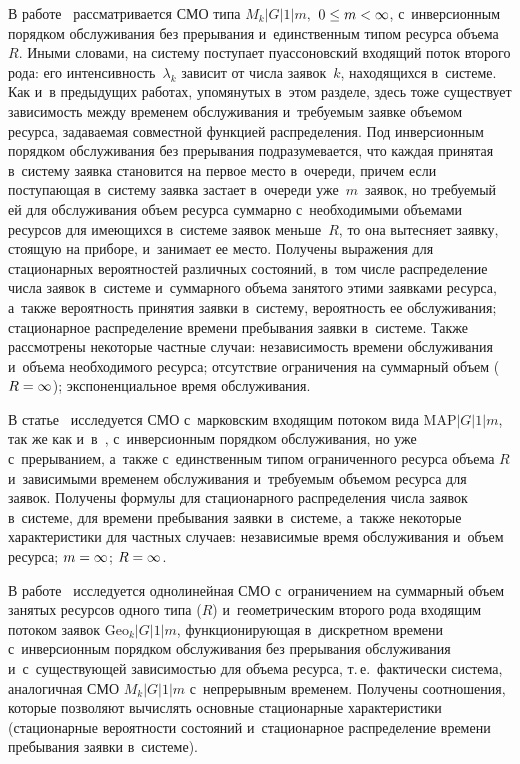 \begin{multicols}{2}
В работе~\cite{Pechinkin_30_1998} рассматривается СМО типа $M_k|G|1|m,$ $0\hm\leq m 
\hm<\infty$, с~инверсионным порядком обслуживания без прерывания и~единственным 
типом ресурса объема~$R$. Иными словами, на сис\-те\-му поступает пуассоновский 
входящий поток второго рода: его интенсивность~$\lambda_k$ зависит от числа 
заявок~$k$, находящихся в~сис\-те\-ме. Как и~в предыду\-щих работах, упомянутых в~этом 
разделе, здесь тоже существует зависимость между временем обслуживания 
и~требуемым заявке объемом ресурса, задаваемая совместной функцией распределения. 
Под инверсионным порядком обслуживания без прерывания подразумевается, что 
каждая принятая в~сис\-те\-му заявка становится на первое место в~очереди, причем 
если поступающая в~сис\-те\-му заявка застает в~очереди уже~$m$~заявок, но требуемый 
ей для обслуживания объем ресурса суммарно с~необходимыми объемами ресурсов для 
имеющихся в~сис\-те\-ме заявок меньше~$R$, то она вытесняет заявку, стоящую на 
приборе, и~занимает ее место. Получены выражения для стационарных вероятностей 
различных состояний, в~том числе распределение числа заявок в~сис\-те\-ме 
и~суммарного объема занятого этими заявками ресурса, а~также вероятность принятия 
заявки в~сис\-те\-му, вероятность ее обслуживания; стационарное распределение 
времени пребывания заявки в~сис\-те\-ме. Также рассмотрены некоторые частные случаи: 
независимость времени обслуживания и~объема необходимого ресурса; отсутствие 
ограничения на суммарный объем ($R\hm=\infty$); экспоненциальное время 
обслуживания.

В статье~\cite{Pechinkin_31_1999} исследуется СМО с~марковским входящим потоком 
вида $\mathrm{MAP}|G|1|m$, так же как и~в~\cite{Pechinkin_30_1998}, с~инверсионным 
порядком обслуживания, но уже с~прерыванием, а~также с~единственным типом 
ограниченного ресурса объема $R$ и~зависимыми временем обслуживания и~требуемым 
объемом ресурса для заявок. Получены формулы для стационарного распределения 
числа заявок в~сис\-те\-ме, для времени пребывания заявки в~сис\-те\-ме, а~также 
некоторые характеристики для частных случаев: независимые время обслуживания 
и~объем ресурса; $m\hm=\infty$; $R\hm=\infty$.

В работе~\cite{Pechinkin_28_2011} исследуется однолинейная СМО с~ограничением на 
суммарный объем занятых ресурсов одного типа ($R$) и~геометрическим второго рода 
входящим потоком заявок $\mathrm{Geo}_k|G|1|m$, функционирующая в~дискретном времени 
с~инверсионным порядком обслуживания без прерывания обслуживания и~с~существующей 
зависимостью для объема ресурса, т.\,е.\ фактически сис\-те\-ма, аналогичная СМО 
$M_k|G|1|m$ с~непрерывным временем. Получены соотношения, которые позволяют 
вычислять основные стационарные характеристики (стационарные ве\-ро\-ят\-ности 
состояний и~стационарное распределение времени пребывания заявки в~сис\-теме).


\end{multicols}
